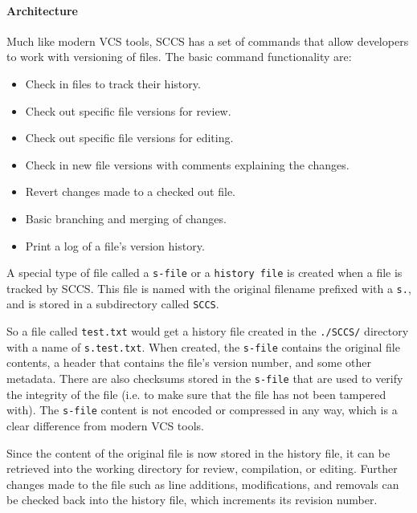 \paragraph{Architecture}
Much like modern VCS tools, SCCS has a set of commands that allow developers to work with versioning of files. The basic command functionality are:
\begin{itemize}
    \item Check in files to track their history.
    \item Check out specific file versions for review.
    \item Check out specific file versions for editing.
    \item Check in new file versions with comments explaining the changes.
    \item Revert changes made to a checked out file.
    \item Basic branching and merging of changes.
    \item Print a log of a file's version history.
\end{itemize}
A special type of file called a \lstinline{s-file} or a \lstinline{history file} is created when a file is tracked by SCCS. This file is named with the original filename prefixed with a \lstinline{s.}, and is stored in a subdirectory called \lstinline{SCCS}.

So a file called \lstinline{test.txt} would get a history file created in the \lstinline{./SCCS/} directory with a name of \lstinline{s.test.txt}. When created, the \lstinline{s-file} contains the original file contents, a header that contains the file's version number, and some other metadata. There are also checksums stored in the \lstinline{s-file} that are used to verify the integrity of the file (i.e. to make sure that the file has not been tampered with). The \lstinline{s-file} content is not encoded or compressed in any way, which is a clear difference from modern VCS tools.

Since the content of the original file is now stored in the history file, it can be retrieved into the working directory for review, compilation, or editing. Further changes made to the file such as line additions, modifications, and removals can be checked back into the history file, which increments its revision number.

